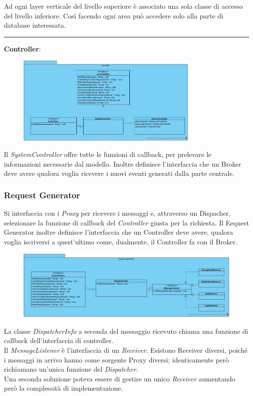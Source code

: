 Ad ogni layer verticale del livello superiore è associato una sola classe di accesso del livello inferiore. Così facendo ogni area può accedere solo alla parte di database interessata. 
\vspace{0.5cm}
\hrule
\vspace{0.5cm}
\textbf{Controller}:
\begin{figure}[H]
	\centering
	\includegraphics[width=0.8\textwidth]{Immagini/controller.jpg}
\end{figure}
Il \textit{SystemController} offre tutte le funzioni di callback, per prelevare le informazioni necessarie dal modello. Inoltre definisce l’interfaccia che un Broker deve avere qualora voglia ricevere i nuovi eventi generati dalla parte centrale.

\subsubsection{Request Generator}
Si interfaccia con i \textit{Proxy} per ricevere i messaggi e, attraverso un Dispacher, selezionare la funzione di callback del \textit{Controller} giusta per la richiesta. Il Eequest Generator inoltre definisce l’interfaccia che un Controller deve avere, qualora voglia iscriversi a quest’ultimo come, dualmente, il Controller fa con il Broker.
\begin{figure}[H]
	\centering
	\includegraphics[width=\textwidth]{Immagini/request_generator.jpg}
\end{figure}
La classe \textit{DispatcherInfo} a seconda del messaggio ricevuto chiama una funzione di callback dell'interfaccia di controller.
\\Il \textit{MessageListener} è l'interfaccia di un \textit{Receiver}. Esistono Receiver diversi, poiché i messaggi in arrivo hanno come sorgente Proxy diversi; identicamente però richiamano un'unica funzione del \textit{Dispatcher}.
\\Una seconda soluzione poteva essere di gestire un unico \textit{Receiver} aumentando però la complessità di implementazione. 	

